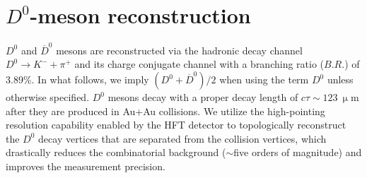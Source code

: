 \documentclass[%
 reprint,	
showpacs,
 amsmath,amssymb,
 aps,
 prc,
]{revtex4-1}
\providecommand{\DIFaddtex}[1]{{\protect\color{blue}\uwave{#1}}} %
\providecommand{\DIFdeltex}[1]{{\protect\color{red}\sout{#1}}}                      %
\providecommand{\DIFaddbegin}{} %
\providecommand{\DIFaddend}{} %
\providecommand{\DIFdelbegin}{} %
\providecommand{\DIFdelend}{} %
\providecommand{\DIFadd}[1]{\texorpdfstring{\DIFaddtex{#1}}{#1}} %
\providecommand{\DIFdel}[1]{\texorpdfstring{\DIFdeltex{#1}}{}} %
\begin{document}
\section{$D^0$-meson reconstruction}
\label{D0recon}

$D^0$ and $\overline{D}^{0}$ mesons are reconstructed via the hadronic decay channel \DIFdelbegin \DIFdel{$D^0\rightarrow K^-+\pi^+$ }\DIFdelend \DIFaddbegin \DIFadd{$D^0\rightarrow K^-\pi^+$ }\DIFaddend and its charge conjugate channel with a branching ratio ($B.R.$) of 3.89\%\DIFaddbegin \DIFadd{~\mbox{%
\cite{pdg}}%
}\DIFaddend . In what follows, we imply $(D^0 +\overline{D}^{0})/2$ when using the term $D^0$ unless otherwise specified. $D^0$ mesons decay with a proper decay length of \DIFdelbegin \DIFdel{$c\tau\sim123\ \upmu$}\DIFdelend \DIFaddbegin \DIFadd{$c\tau$ $\sim$\,123\ $\upmu$}\DIFaddend m after they are produced in Au+Au collisions. We utilize the high-pointing resolution capability enabled by the HFT detector to topologically reconstruct the $D^0$ decay vertices that are separated from the collision vertices, which drastically reduces the combinatorial background ($\sim$\DIFaddbegin \DIFadd{\,}\DIFaddend five orders of magnitude) and improves the measurement precision.
\end{document}
